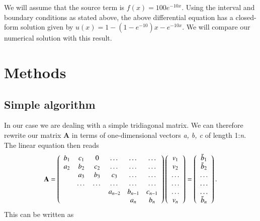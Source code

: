 \documentclass{article}
\begin{document}
\begin{multicols}{2}
We will assume that the source term is $f(x) = 100e^{-10x}$. Using the interval and boundary conditions as stated above, the above differential equation has a closed-form  solution given by $u(x) = 1-(1-e^{-10})x-e^{-10x}$. We will compare our numerical solution with this result. 





\section{Methods}
\subsection{Simple algorithm}
In our case we are dealing with a simple tridiagonal matrix. We can therefore rewrite our matrix \textbf{A} in terms of one-dimensional vectors \textit{a, b, c} of length 1:\textit{n}. The linear equation then reads
\begin{equation}
    {\bf A} = \left(\begin{array}{cccccc}
                           b_1& c_1 & 0 &\dots   & \dots &\dots \\
                           a_2 & b_2 & c_2 &\dots &\dots &\dots \\
                           & a_3 & b_3 & c_3 & \dots & \dots \\
                           & \dots   & \dots &\dots   &\dots & \dots \\
                           &   &  &a_{n-2}  &b_{n-1}& c_{n-1} \\
                           &    &  &   &a_n & b_n \\
                      \end{array} \right)\left(\begin{array}{c}
                           v_1\\
                           v_2\\
                           \dots \\
                          \dots  \\
                          \dots \\
                           v_n\\
                      \end{array} \right)
  =\left(\begin{array}{c}
                           \tilde{b}_1\\
                           \tilde{b}_2\\
                           \dots \\
                           \dots \\
                          \dots \\
                           \tilde{b}_n\\
                      \end{array} \right).
\end{equation}
This can be written as


\end{multicols}
\end{document}
